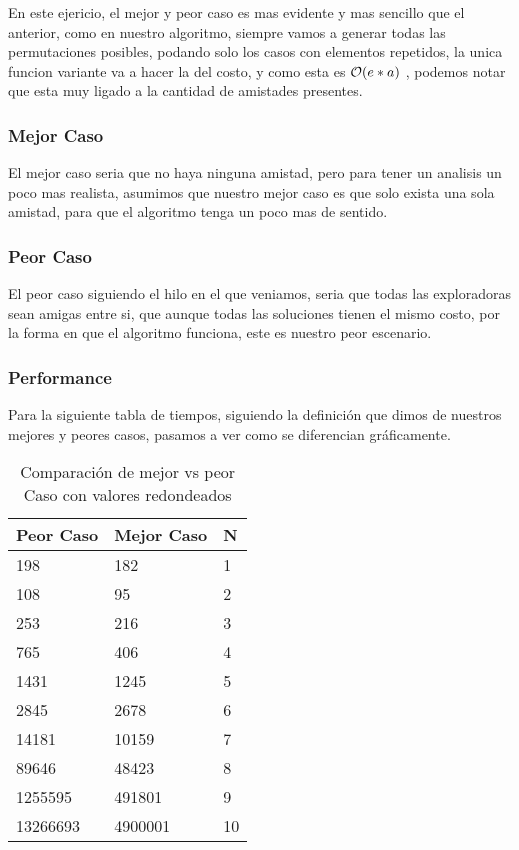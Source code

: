 En este ejericio, el mejor y peor caso es mas evidente y mas sencillo que el anterior, como en nuestro algoritmo, siempre vamos a generar todas las permutaciones posibles, podando solo los casos con elementos repetidos, la unica funcion variante va a hacer la del costo, y como esta es $\mathcal{O}(e * a)$ , podemos notar que esta muy ligado a la cantidad de amistades presentes.
    \subsubsection{Mejor Caso}
      El mejor caso seria que no haya ninguna amistad, pero para tener un analisis un poco mas realista, asumimos que nuestro mejor caso es que solo exista una sola amistad, para que el algoritmo tenga un poco mas de sentido.
    
    \subsubsection{Peor Caso}
        El peor caso siguiendo el hilo en el que veniamos, seria que todas las exploradoras sean amigas entre si, que aunque todas las soluciones tienen el mismo costo, por la forma en que el algoritmo funciona, este es nuestro peor escenario. 
 
 
\pagebreak

\subsubsection{Performance}

Para la siguiente tabla de tiempos, siguiendo la definici\'on que dimos de nuestros mejores y peores casos, pasamos a ver como se diferencian gr\'aficamente.

\begin{table}[htb]
\centering
\begin{tabular}{|l|l|l|}
\hline
 Peor Caso	& Mejor Caso & N \\ \hline
198 & 182 & 1 \\ \hline
108 & 95 & 2 \\ \hline
253 & 216 & 3 \\ \hline
765 & 406 & 4 \\ \hline
1431 & 1245 & 5 \\ \hline
2845 & 2678 & 6 \\ \hline
14181 & 10159 & 7 \\ \hline
89646 & 48423 & 8 \\ \hline
1255595 & 491801 & 9 \\ \hline
13266693 & 4900001 & 10 \\ \hline
\end{tabular}
\caption{Comparaci\'on de mejor vs peor Caso con valores redondeados}
\label{my-label}
\end{table}

